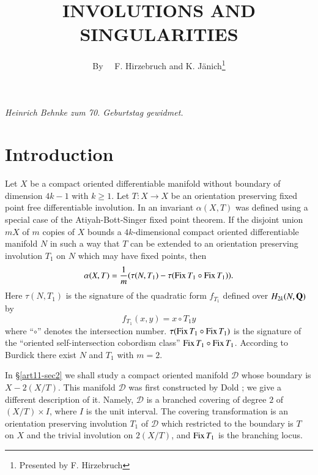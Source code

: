 \title{INVOLUTIONS AND SINGULARITIES}

\author{By~~ F. Hirzebruch and K. J\"anich\footnote{Presented by F. Hirzebruch}}

\date{}

\maketitle

\begin{center}
{\em Heinrich Behnke zum {\rm 70.} Geburtstag gewidmet.}
\end{center}

\setcounter{pageoriginal}{218}
\section{Introduction}\label{art11-sec1}\pageoriginale

Let $X$ be a compact oriented differentiable manifold without boundary of dimension $4k-1$ with $k\geq 1$. Let $T:X\to X$ be an orientation preserving fixed point free differentiable involution. In \cite{art11-key7} an invariant $\alpha(X,T)$ was defined using a special case of the Atiyah-Bott-Singer fixed point theorem. If the disjoint union $mX$ of $m$ copies of $X$ bounds a $4k$-dimensional compact oriented differentiable manifold $N$ in such a way that $T$ can be extended to an orientation preserving involution $T_{1}$ on $N$ which may have fixed points, then
\begin{equation}
\alpha(X,T)=\dfrac{1}{m}(\tau(N,T_{1})- \tau(\operatorname{\mathrm{Fix}} T_{1}\circ \operatorname{\mathrm{Fix}} T_{1})).\label{art11-sec1-eq1}
\end{equation}
Here $\tau(N,T_{1})$ is the signature of the quadratic form $f_{T_{1}}$ defined over $H_{2k}(N,\mathbf{Q})$ by
$$
f_{T_{1}}(x,y)=x\circ T_{1}y
$$
where ``$\circ$'' denotes the intersection number. $\tau(\operatorname{\mathrm{Fix}} T_{1}\circ \operatorname{\mathrm{Fix}} T_{1})$ is the signature of the ``oriented self-intersection cobordism class'' $\operatorname{\mathrm{Fix}} T_{1}\circ \operatorname{\mathrm{Fix}} T_{1}$. According to Burdick \cite{art11-key4} there exist $N$ and $T_{1}$ with $m=2$.

In \S\ref{art11-sec2} we shall study a compact oriented manifold $\mathscr{D}$ whose boundary is $X-2(X/T)$. This manifold $\mathscr{D}$ was first constructed by Dold \cite{art11-key5}; we give a different description of it. Namely, $\mathscr{D}$ is a branched covering of degree $2$ of $(X/T)\times I$, where $I$ is the unit interval. The covering transformation is an orientation preserving involution $T_{1}$ of $\mathscr{D}$ which restricted to the boundary is $T$ on $X$ and the trivial involution on $2(X/T)$, and $\operatorname{\mathrm{Fix}} T_{1}$ is the branching locus.

